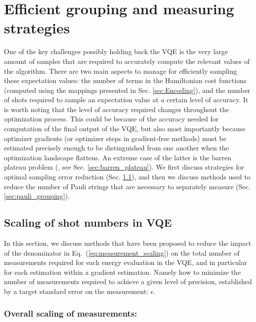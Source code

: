\section{Efficient grouping and measuring strategies} \label{sec:Grouping}

One of the key challenges possibly holding back the VQE is the very large amount of samples that are required to accurately compute the relevant values of the algorithm. There are two main aspects to manage for efficiently sampling these expectation values: the number of terms in the Hamiltonian cost functions (computed using the mappings presented in Sec. \ref{sec:Encoding}), and the number of shots required to sample an expectation value at a certain level of accuracy. It is worth noting that the level of accuracy required changes throughout the optimization process. This could be because of the accuracy needed for computation of the final output of the VQE, but also most importantly because optimizer gradients (or optimizer steps in gradient-free methods) must be estimated precisely enough to be distinguished from one another when the optimization landscape flattens. An extreme case of the latter is the barren plateau problem (\cite{McClean2018}, see Sec. \ref{sec:barren_plateau}). We first discuss strategies for optimal sampling error reduction (Sec. \ref{sec:measurements_strategies}), and then we discuss methods used to reduce the number of Pauli strings that are necessary to separately measure (Sec. \ref{sec:pauli_grouping}).

\subsection{Scaling of shot numbers in VQE}  \label{sec:measurements_strategies}

In this section, we discuss methods that have been proposed to reduce the impact of the denominator in Eq.~(\ref{eq:measurement_scaling}) on the total number of measurements required for each energy evaluation in the VQE, and in particular for each estimation within a gradient estimation. Namely how to minimize the number of measurements required to achieve a given level of precision, established by a target standard error on the measurement: $\epsilon$. 

\subsubsection{Overall scaling of measurements:}

